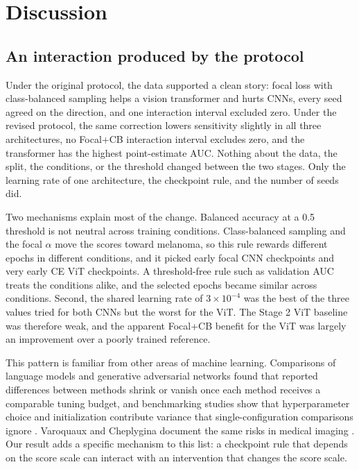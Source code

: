 \section{Discussion}

\subsection{An interaction produced by the protocol}

Under the original protocol, the data supported a clean story: focal loss with class-balanced sampling helps a vision transformer and hurts CNNs, every seed agreed on the direction, and one interaction interval excluded zero. Under the revised protocol, the same correction lowers sensitivity slightly in all three architectures, no Focal+CB interaction interval excludes zero, and the transformer has the highest point-estimate AUC. Nothing about the data, the split, the conditions, or the threshold changed between the two stages. Only the learning rate of one architecture, the checkpoint rule, and the number of seeds did.

Two mechanisms explain most of the change. Balanced accuracy at a 0.5 threshold is not neutral across training conditions. Class-balanced sampling and the focal $\alpha$ move the scores toward melanoma, so this rule rewards different epochs in different conditions, and it picked early focal CNN checkpoints and very early CE ViT checkpoints. A threshold-free rule such as validation AUC treats the conditions alike, and the selected epochs became similar across conditions. Second, the shared learning rate of $3\times10^{-4}$ was the best of the three values tried for both CNNs but the worst for the ViT. The Stage 2 ViT baseline was therefore weak, and the apparent Focal+CB benefit for the ViT was largely an improvement over a poorly trained reference.

This pattern is familiar from other areas of machine learning. Comparisons of language models \citep{melis2018evaluation} and generative adversarial networks \citep{lucic2018gans} found that reported differences between methods shrink or vanish once each method receives a comparable tuning budget, and benchmarking studies show that hyperparameter choice and initialization contribute variance that single-configuration comparisons ignore \citep{bouthillier2021variance,dodge2019showyourwork}. Varoquaux and Cheplygina document the same risks in medical imaging \citep{varoquaux2022failures}. Our result adds a specific mechanism to this list: a checkpoint rule that depends on the score scale can interact with an intervention that changes the score scale.

